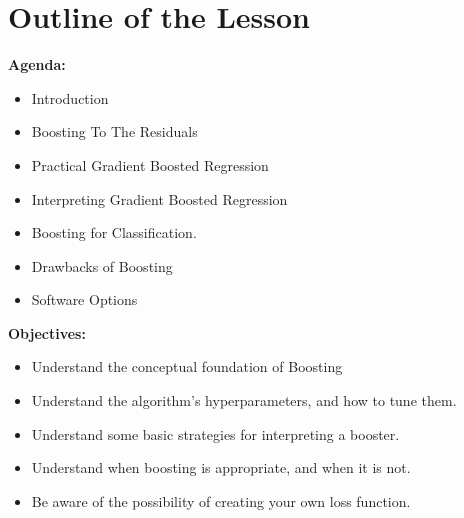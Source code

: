 \section{Outline of the Lesson}
%
\begin{frame}
\textbf{Agenda:}
 
  \begin{itemize}
    \item Introduction
    \item Boosting To The Residuals
    \item Practical Gradient Boosted Regression
    \item Interpreting Gradient Boosted Regression
    \item Boosting for Classification.
    \item Drawbacks of Boosting
    \item Software Options
  \end{itemize}

\end{frame}
%
\begin{frame}
\textbf{Objectives:}

  \begin{itemize}
    \item Understand the conceptual foundation of Boosting
    \item Understand the algorithm's hyperparameters, and how to tune them.
    \item Understand some basic strategies for interpreting a booster.
    \item Understand when boosting is appropriate, and when it is not.
    \item Be aware of the possibility of creating your own loss function.
  \end{itemize}
  
\end{frame}